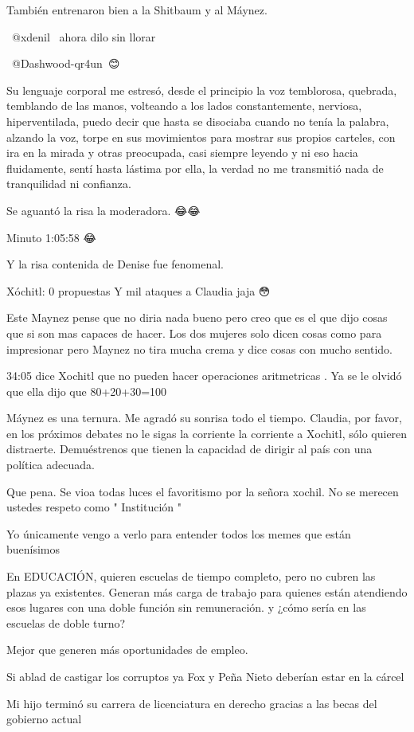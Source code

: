 También entrenaron bien a la Shitbaum y al Máynez.

 @xdenil  ahora dilo sin llorar

​ @Dashwood-qr4un 😊

Su lenguaje corporal me estresó, desde el principio la voz temblorosa, quebrada, temblando de las manos, volteando a los lados constantemente, nerviosa, hiperventilada, puedo decir que hasta se disociaba cuando no tenía la palabra, alzando la voz, torpe en sus movimientos para mostrar sus propios carteles, con ira en la mirada y otras preocupada, casi siempre leyendo y ni eso hacia fluidamente, sentí hasta lástima por ella, la verdad no me transmitió nada de tranquilidad ni confianza.

Se aguantó la risa la moderadora. 😂😂

Minuto 1:05:58 😂

Y la risa contenida de Denise fue fenomenal.

Xóchitl: 0 propuestas 
Y mil ataques a Claudia jaja 😳

Este Maynez pense que no diria nada bueno pero creo que es el que dijo cosas que si son mas capaces de hacer. Los dos mujeres solo dicen cosas como para impresionar pero Maynez no tira mucha crema y dice cosas con mucho sentido.

34:05 dice Xochitl que no pueden hacer operaciones aritmetricas . Ya se le olvidó que ella dijo que 80+20+30=100

Máynez es una ternura. Me agradó su sonrisa todo el tiempo. Claudia, por favor, en los próximos debates no le sigas la corriente la corriente a Xochitl, sólo quieren distraerte. Demuéstrenos que tienen la capacidad de dirigir al país con una política adecuada.

Que pena. Se vioa todas luces el favoritismo por la señora xochil.  No se merecen ustedes respeto como " Institución "

Yo únicamente vengo a verlo para entender todos los memes que están buenísimos 🤣

En EDUCACIÓN, quieren escuelas de tiempo completo, pero no cubren las plazas ya existentes. Generan más carga de trabajo para quienes están atendiendo esos lugares con una doble función sin remuneración.
y ¿cómo sería en las escuelas de doble turno?

Mejor que generen más oportunidades de empleo.

Si ablad de castigar los corruptos ya Fox y Peña Nieto deberían estar en la cárcel

Mi hijo terminó su carrera de licenciatura en derecho gracias a las becas del gobierno actual

